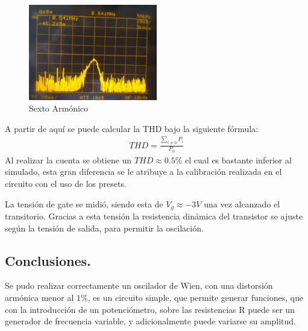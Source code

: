 \begin{figure}[H]
	\centering
	\includegraphics[width=0.5\textwidth]{Imagenes-Ej1/6Armonico.jpeg}
	\caption{Sexto Armónico}
	\label{fig:6to}
\end{figure}
 A partir de aquí se puede calcular la THD bajo la siguiente fórmula:
 \begin{align}
 THD= \frac{\sum_{i\neq 0} P_i}{P_0}
 \end{align}
Al realizar la cuenta se obtiene un $THD\approx 0.5\%$ el cual es bastante inferior al simulado, esta gran diferencia se le atribuye a la calibración realizada en el circuito con el uso de los presets.


La tensión de gate se midió, siendo esta de $V_g \approx -3V$ una vez alcanzado el transitorio. Gracias a esta tensión la resistencia dinámica del transistor se ajuste según la tensión de salida, para permitir la oscilación.
\subsection{Conclusiones.}
Se pudo realizar correctamente un oscilador de Wien, con una distorsión armónica menor al $1\%$, es un circuito simple, que permite generar funciones, que con la introducción de un potenciómetro, sobre las resistencias R puede ser un generador de frecuencia variable, y adicionalmente puede variarse su amplitud.
